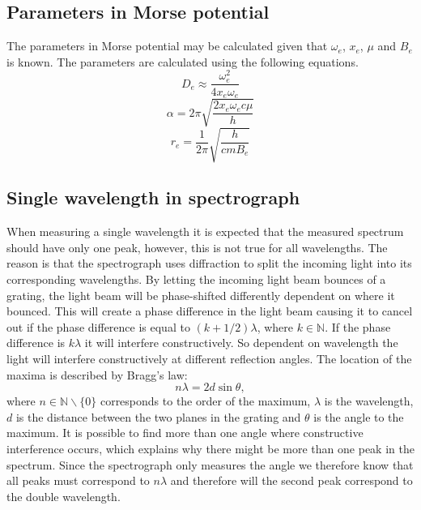 \documentclass[12pt]{article}
\begin{document}
\subsection{Parameters in Morse potential}
The parameters in Morse potential may be calculated given that $\omega_e$, $x_e$, $\mu$ and $B_e$ is known. The parameters are calculated using the following equations.
\begin{equation}
    D_e \approx \frac{\omega_e^2}{4x_e\omega_e}
\end{equation}
\begin{equation}
    \alpha = 2\pi \sqrt{\frac{2x_e\omega_ec\mu}{h}}
\end{equation}
\begin{equation}
    r_e = \frac{1}{2\pi} \sqrt{\frac{h}{cmB_e}}
\end{equation}

\subsection{Single wavelength in spectrograph}
\label{secondpeak}
When measuring a single wavelength it is expected that the measured spectrum should have only one peak, however, this is not true for all wavelengths. The reason is that the spectrograph uses diffraction to split the incoming light into its corresponding wavelengths. By letting the incoming light beam bounces of a grating, the light beam will be phase-shifted differently dependent on where it bounced. This will create a phase difference in the light beam causing it to cancel out if the phase difference is equal to $(k+1/2)\lambda$, where $k \in \mathbb{N}$. If the phase difference is $k\lambda$ it will interfere constructively. So dependent on wavelength the light will interfere constructively at different reflection angles. The location of the maxima is described by Bragg's law:
\begin{equation}
    n\lambda = 2d\sin{\theta},
\end{equation}
where $n \in \mathbb{N}\backslash \{0\}$ corresponds to the order of the maximum, $\lambda$ is the wavelength, $d$ is the distance between the two planes in the grating and $\theta$ is the angle to the maximum. It is possible to find more than one angle where constructive interference occurs, which explains why there might be more than one peak in the spectrum. Since the spectrograph only measures the angle we therefore know that all peaks must correspond to $n\lambda$ and therefore will the second peak correspond to the double wavelength.
\end{document}
